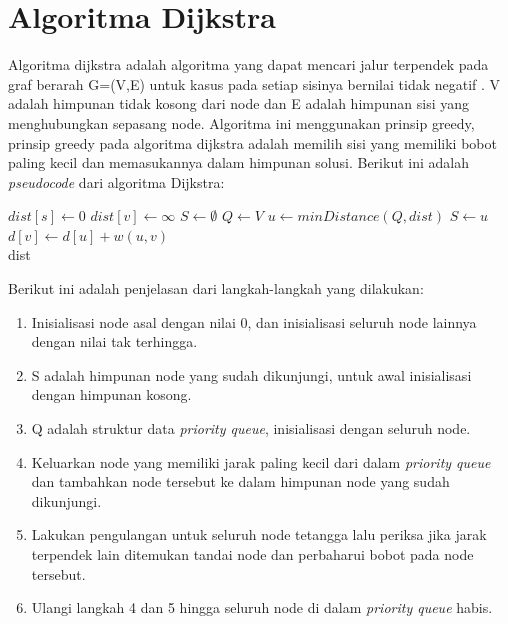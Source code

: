 \section{Algoritma Dijkstra}
Algoritma dijkstra adalah algoritma yang dapat mencari jalur terpendek pada graf
berarah G=(V,E) untuk kasus pada setiap sisinya bernilai tidak
negatif \cite{Cormen:2001}. V adalah himpunan tidak kosong dari node dan E
adalah himpunan sisi yang menghubungkan sepasang node. Algoritma ini menggunakan
prinsip greedy, prinsip greedy pada algoritma dijkstra adalah memilih sisi yang
memiliki bobot paling kecil dan memasukannya dalam himpunan solusi. Berikut ini adalah
\textit{pseudocode} dari algoritma Dijkstra:
\begin{algorithm}{}\label{dijkstra}
\caption{$Dijkstra$}
\begin{algorithmic}
\State $dist[s] \leftarrow 0$
\State $dist[v] \leftarrow \infty$ 
\EndFor
\State $S \leftarrow \emptyset$
\State $Q \leftarrow V$
\State $u \leftarrow  minDistance(Q,dist)$
\State $S \leftarrow u$
\State $d[v] \leftarrow d[u] + w(u,  v)$
\EndIf
\EndFor
\EndWhile \\
\Return dist
\end{algorithmic}
\end{algorithm}

Berikut ini adalah penjelasan dari langkah-langkah yang dilakukan:
\begin{enumerate}
  \item Inisialisasi node asal dengan nilai 0, dan inisialisasi seluruh node
  lainnya dengan nilai tak terhingga.
  
  \item S adalah himpunan node yang sudah dikunjungi, untuk awal inisialisasi
  dengan himpunan kosong.
  
  \item Q adalah struktur data \textit{priority queue}, inisialisasi dengan
  seluruh node.
  
  \item Keluarkan node yang memiliki jarak paling kecil dari dalam
  \textit{priority queue} dan tambahkan node tersebut ke dalam himpunan node
  yang sudah dikunjungi.
  
  \item Lakukan pengulangan untuk seluruh node tetangga lalu periksa jika jarak
  terpendek lain ditemukan tandai node dan perbaharui bobot pada node
  tersebut.
  
  \item Ulangi langkah 4 dan 5 hingga seluruh node di dalam
  \textit{priority queue} habis.
\end{enumerate}

